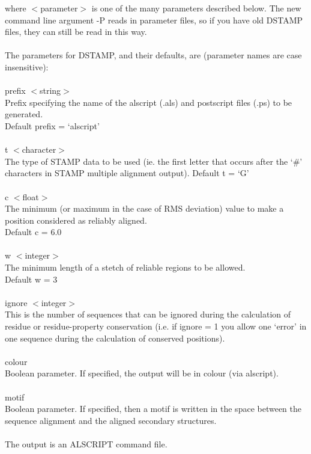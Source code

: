     where $<$parameter$>$ is one of the many parameters described below.
    The new command line argument -P reads in parameter files, so if 
    you have old DSTAMP files, they can still be read in this way. \\
    \\
    The parameters for DSTAMP, and their defaults, are (parameter names
    are case insensitive):\\
    \\
    prefix $<$string$>$ \\
    Prefix specifying the name of the alscript (.als) and postscript files (.ps)
    to be generated.\\
    Default prefix = `alscript'\\
    \\
    t  $<$character$>$\\
    The type of STAMP data to be used (ie. the first letter that 
    occurs after the `\#' characters in STAMP multiple alignment
    output).
    Default t = `G'\\
    \\
    c  $<$float$>$ \\
    The minimum (or maximum in the case of RMS deviation) value to make
    a position considered as reliably aligned.\\
    Default c = 6.0\\
    \\
    w     $<$integer$>$ \\
    The minimum length of a stetch of reliable regions to be allowed.\\
    Default w = 3\\
    \\
    ignore $<$integer$>$\\
    This is the number of sequences that can be ignored during the calculation
    of residue or residue-property conservation (i.e. if ignore = 1 you allow
    one `error' in one sequence during the calculation of conserved positions).\\
    \\
    colour\\
    Boolean parameter.  If specified, the output will be in colour (via alscript).\\
    \\
    motif\\
    Boolean parameter.  If specified, then a motif is written in the space between
    the sequence alignment and the aligned secondary structures.\\
    \\
    The output is an ALSCRIPT command file.

